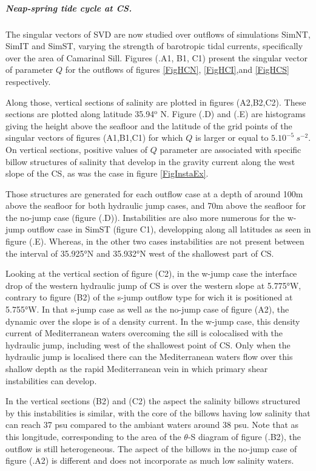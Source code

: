 \subparagraph{Neap-spring tide cycle at CS.}
The singular vectors of SVD are now studied over outflows of simulations SimNT, SimIT and SimST, varying the strength of barotropic tidal currents, specifically over the area of Camarinal Sill. Figures (.A1, B1, C1) present the singular vector of parameter $Q$ for the outflows of figures \ref{FigHCN}, \ref{FigHCI},and \ref{FigHCS} respectively.

Along those, vertical sections of salinity are plotted in figures (A2,B2,C2). These sections are plotted along latitude 35.94$^\text{o}$ N. Figure (.D) and (.E) are histograms giving the height above the seafloor and the latitude of the grid points of the singular vectors of figures (A1,B1,C1) for which $Q$ is larger or equal to $5.10^{-5}\ s^{-2}$. On vertical sections, positive values of $Q$ parameter are associated with specific billow structures of salinity that develop in the gravity current along the west slope of the CS, as was the case in figure \ref{FigInstaEx}. 

Those structures are generated for each outflow case at a depth of around 100m above the seafloor for both hydraulic jump cases, and 70m above the seafloor for the no-jump case (figure (.D)). Instabilities are also more numerous for the w-jump outflow case in SimST (figure C1), developping along all latitudes as seen in figure (.E). Whereas, in the other two cases instabilities are not present between the interval of 35.925°N and 35.932°N west of the shallowest part of CS.

Looking at the vertical section of figure (C2), in the w-jump case the interface drop of the western hydraulic jump of CS is over the western slope at 5.775°W, contrary to figure (B2) of the s-jump outflow type for wich it is positioned at 5.755°W. In that s-jump case as well as the no-jump case of figure (A2), the dynamic over the slope is of a density current. In the w-jump case, this density current of Mediterranean waters overcoming the sill is colocalised with the hydraulic jump, including west of the shallowest point of CS. Only when the hydraulic jump is localised there can the Mediterranean waters flow over this shallow depth as the rapid Mediterranean vein in which primary shear instabilities can develop. 

In the vertical sections (B2) and (C2) the aspect the salinity billows structured by this instabilities is similar, with the core of the billows having low salinity that can reach 37 psu compared to the ambiant waters around 38 psu. Note that as this longitude, corresponding to the area of the $\theta$-S diagram of figure (.B2), the outflow is still heterogeneous. The aspect of the billows in the no-jump case of figure (.A2) is different and does not incorporate as much low salinity waters.


